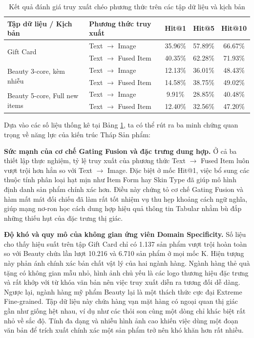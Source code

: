 \begin{table}[ht]
\centering
\caption{Kết quả đánh giá truy xuất chéo phương thức trên các tập dữ liệu và kịch bản}
\label{tab:cross_modal_retrieval}
\renewcommand{\arraystretch}{1.2}
\begin{tabular}{llccc}
\hline
\textbf{Tập dữ liệu / Kịch bản} & \textbf{Phương thức truy xuất} & \textbf{Hit@1} & \textbf{Hit@5} & \textbf{Hit@10} \\ \hline
\multirow{2}{*}{Gift Card} 
& Text $\rightarrow$ Image & 35.96\% & 57.89\% & 66.67\% \\
& Text $\rightarrow$ Fused Item & 40.35\% & 62.28\% & 71.93\% \\ \hline
\multirow{2}{*}{Beauty 3-core, kèm nhiễu} 
& Text $\rightarrow$ Image & 12.13\% & 36.01\% & 48.43\% \\
& Text $\rightarrow$ Fused Item & 14.58\% & 38.75\% & 49.02\% \\ \hline
\multirow{2}{*}{Beauty 5-core, Full new items} 
& Text $\rightarrow$ Image & 9.91\% & 28.85\% & 40.48\% \\
& Text $\rightarrow$ Fused Item & 12.40\% & 32.56\% & 47.20\% \\ \hline
\end{tabular}
\end{table}

Dựa vào các số liệu thống kê tại Bảng \ref{tab:cross_modal_retrieval}, ta có thể rút ra ba minh chứng quan trọng về năng lực của kiến trúc Tháp Sản phẩm:

\textbf{Sức mạnh của cơ chế Gating Fusion và đặc trưng dung hợp.} Ở cả ba thiết lập thực nghiệm, tỷ lệ truy xuất của phương thức Text $\rightarrow$ Fused Item luôn vượt trội hơn hẳn so với Text $\rightarrow$ Image. Đặc biệt ở mốc Hit@1, việc bổ sung các thuộc tính phân loại hạt mịn như Item Form hay Skin Type đã giúp mô hình định danh sản phẩm chính xác hơn. Điều này chứng tỏ cơ chế Gating Fusion và hàm mất mát đối chiếu đã làm rất tốt nhiệm vụ thu hẹp khoảng cách ngữ nghĩa, giúp mạng nơ-ron học cách dung hợp hiệu quả thông tin Tabular nhằm bù đắp những thiếu hụt của đặc trưng thị giác.

\textbf{Độ khó và quy mô của không gian ứng viên Domain Specificity.} Số liệu cho thấy hiệu suất trên tập Gift Card chỉ có 1.137 sản phẩm vượt trội hoàn toàn so với Beauty chứa lần lượt 10.216 và 6.710 sản phẩm ở mọi mốc K. Hiện tượng này phản ánh chính xác bản chất vật lý của hai ngành hàng. Ngành hàng thẻ quà tặng có không gian mẫu nhỏ, hình ảnh chủ yếu là các logo thương hiệu đặc trưng và rất khớp với từ khóa văn bản nên việc truy xuất diễn ra tương đối dễ dàng. Ngược lại, ngành hàng mỹ phẩm Beauty lại là một thách thức cực đại Extreme Fine-grained. Tập dữ liệu này chứa hàng vạn mặt hàng có ngoại quan thị giác gần như giống hệt nhau, ví dụ như các thỏi son cùng một dòng chỉ khác biệt rất nhỏ về sắc độ. Tính đa dạng và nhiễu hình ảnh cao khiến việc dùng một đoạn văn bản để trích xuất chính xác một sản phẩm trở nên khó khăn hơn rất nhiều.


